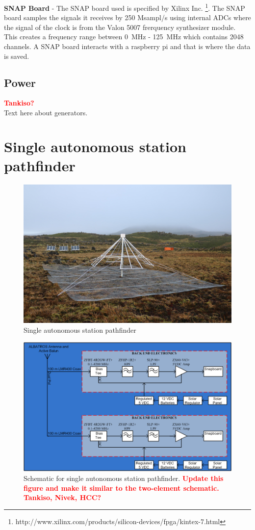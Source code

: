 \documentclass{ws-jai}
\begin{document}
\textbf{SNAP Board} - The SNAP board used is specified by Xilinx
Inc. \footnote{http://www.xilinx.com/products/silicon-devices/fpga/kintex-7.html}. The
SNAP board samples the signals it receives by 250 Msampl/s using
internal ADCs where the signal of the clock is from the Valon 5007
frerquency synthesizer module. This creates a frequency range between
\SI{0}{MHz} - \SI{125}{MHz} which contains 2048 channels. A SNAP board
interacts with a raspberry pi and that is where the data is saved.

\subsection{Power}
\textcolor{red}{\bf Tankiso?} \\
Text here about generators.

\section{Single autonomous station pathfinder}

\begin{figure}
  \begin{center}
    \includegraphics[width=0.7\linewidth]{Figures/autonomous.jpg}
    \caption{Single autonomous station pathfinder}
    \label{Fig:autonomous}
  \end{center}
\end{figure}

\begin{figure}
  \begin{center}
    \includegraphics[width=0.7\linewidth]{Figures/Signal-Chain.png}
    \caption{Schematic for single autonomous station pathfinder.
      \textcolor{red}{\bf Update this figure and make it similar to
        the two-element schematic.  Tankiso, Nivek, HCC?}}
    \label{Fig:Signal Chain}
  \end{center}
\end{figure}
\end{document}
